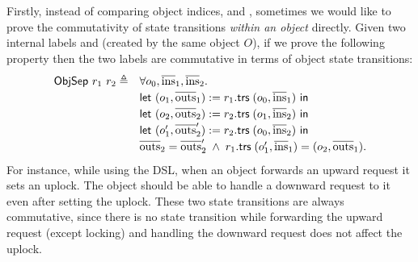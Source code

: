 Firstly, instead of comparing object indices,  and , sometimes we would like to prove the commutativity of state transitions \emph{within an object} directly.
Given two internal labels  and  (created by the same object $O$), if we prove the following property then the two labels are commutative in terms of object state transitions:
\begin{displaymath}
  \renewcommand{\arraystretch}{1.2}
  \begin{array}{rl}
    \objsep{r_1}{r_2} \triangleq & \forall o_0, \listof{\mathrm{ins}}_1, \listof{\mathrm{ins}}_2.\\
    & \mathsf{let}\ (o_1, \listof{\mathrm{outs}}_1) := \rtrsOf{r_1}\;(o_0, \listof{\mathrm{ins}}_1)\ \mathsf{in}\\
    & \mathsf{let}\ (o_2, \listof{\mathrm{outs}}_2) := \rtrsOf{r_2}\;(o_1, \listof{\mathrm{ins}}_2)\ \mathsf{in}\\
    & \mathsf{let}\ (o_1', \listof{\mathrm{outs}}_2') := \rtrsOf{r_2}\;(o_0, \listof{\mathrm{ins}}_2)\ \mathsf{in}\\
    & \listof{\mathrm{outs}}_2 = \listof{\mathrm{outs}}_2' \;\wedge\;
    \rtrsOf{r_1}\;(o_1', \listof{\mathrm{ins}}_1) = (o_2, \listof{\mathrm{outs}}_1).
  \end{array}
\end{displaymath}
For instance, while using the \hemiola{} DSL, when an object forwards an upward request it sets an uplock.
The object should be able to handle a downward request to it even after setting the uplock.
These two state transitions are always commutative, since there is no state transition while forwarding the upward request (except locking) and handling the downward request does not affect the uplock.

